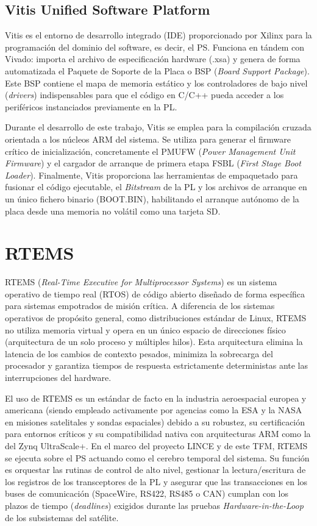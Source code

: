 \subsection{Vitis Unified Software Platform}

Vitis es el entorno de desarrollo integrado (IDE) proporcionado por Xilinx para la
programación del dominio del software, es decir, el PS. Funciona en tándem con Vivado:
importa el archivo de especificación hardware (.xsa) y genera de forma automatizada el
Paquete de Soporte de la Placa o BSP (\textit{Board Support Package}). Este BSP contiene el mapa
de memoria estático y los controladores de bajo nivel (\textit{drivers}) indispensables para que el
código en C/C++ pueda acceder a los periféricos instanciados previamente en la PL.

Durante el desarrollo de este trabajo, Vitis se emplea para la compilación cruzada orientada a
los núcleos ARM del sistema. Se utiliza para generar el firmware crítico de inicialización,
concretamente el PMUFW (\textit{Power Management Unit Firmware}) y el cargador de arranque de
primera etapa FSBL (\textit{First Stage Boot Loader}). Finalmente, Vitis proporciona las herramientas
de empaquetado para fusionar el código ejecutable, el \textit{Bitstream} de la PL y los archivos de
arranque en un único fichero binario (BOOT.BIN), habilitando el arranque autónomo de la
placa desde una memoria no volátil como una tarjeta SD.

\section{RTEMS}

RTEMS (\textit{Real-Time Executive for Multiprocessor Systems}) es un sistema operativo de tiempo
real (RTOS) de código abierto diseñado de forma específica para sistemas empotrados de
misión crítica. A diferencia de los sistemas operativos de propósito general, como
distribuciones estándar de Linux, RTEMS no utiliza memoria virtual y opera en un único
espacio de direcciones físico (arquitectura de un solo proceso y múltiples hilos). Esta
arquitectura elimina la latencia de los cambios de contexto pesados, minimiza la sobrecarga
del procesador y garantiza tiempos de respuesta estrictamente deterministas ante las
interrupciones del hardware.

El uso de RTEMS es un estándar de facto en la industria aeroespacial europea y americana
(siendo empleado activamente por agencias como la ESA y la NASA en misiones satelitales y
sondas espaciales) debido a su robustez, su certificación para entornos críticos y su
compatibilidad nativa con arquitecturas ARM como la del Zynq UltraScale+. En el marco del
proyecto LINCE y de este TFM, RTEMS se ejecuta sobre el PS actuando como el cerebro
temporal del sistema. Su función es orquestar las rutinas de control de alto nivel, gestionar
la lectura/escritura de los registros de los transceptores de la PL y asegurar que las
transacciones en los buses de comunicación (SpaceWire, RS422, RS485 o CAN) cumplan con
los plazos de tiempo (\textit{deadlines}) exigidos durante las pruebas \textit{Hardware-in-the-Loop} de los
subsistemas del satélite.

